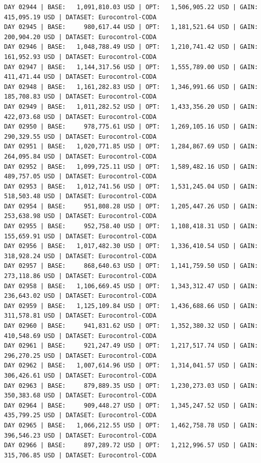 \documentclass[11pt,a4paper]{article}
\begin{document}
\begin{verbatim}
DAY 02944 | BASE:   1,091,810.03 USD | OPT:   1,506,905.22 USD | GAIN: 415,095.19 USD | DATASET: Eurocontrol-CODA
DAY 02945 | BASE:     980,617.44 USD | OPT:   1,181,521.64 USD | GAIN: 200,904.20 USD | DATASET: Eurocontrol-CODA
DAY 02946 | BASE:   1,048,788.49 USD | OPT:   1,210,741.42 USD | GAIN: 161,952.93 USD | DATASET: Eurocontrol-CODA
DAY 02947 | BASE:   1,144,317.56 USD | OPT:   1,555,789.00 USD | GAIN: 411,471.44 USD | DATASET: Eurocontrol-CODA
DAY 02948 | BASE:   1,161,282.83 USD | OPT:   1,346,991.66 USD | GAIN: 185,708.83 USD | DATASET: Eurocontrol-CODA
DAY 02949 | BASE:   1,011,282.52 USD | OPT:   1,433,356.20 USD | GAIN: 422,073.68 USD | DATASET: Eurocontrol-CODA
DAY 02950 | BASE:     978,775.61 USD | OPT:   1,269,105.16 USD | GAIN: 290,329.55 USD | DATASET: Eurocontrol-CODA
DAY 02951 | BASE:   1,020,771.85 USD | OPT:   1,284,867.69 USD | GAIN: 264,095.84 USD | DATASET: Eurocontrol-CODA
DAY 02952 | BASE:   1,099,725.11 USD | OPT:   1,589,482.16 USD | GAIN: 489,757.05 USD | DATASET: Eurocontrol-CODA
DAY 02953 | BASE:   1,012,741.56 USD | OPT:   1,531,245.04 USD | GAIN: 518,503.48 USD | DATASET: Eurocontrol-CODA
DAY 02954 | BASE:     951,808.28 USD | OPT:   1,205,447.26 USD | GAIN: 253,638.98 USD | DATASET: Eurocontrol-CODA
DAY 02955 | BASE:     952,758.40 USD | OPT:   1,108,418.31 USD | GAIN: 155,659.91 USD | DATASET: Eurocontrol-CODA
DAY 02956 | BASE:   1,017,482.30 USD | OPT:   1,336,410.54 USD | GAIN: 318,928.24 USD | DATASET: Eurocontrol-CODA
DAY 02957 | BASE:     868,640.63 USD | OPT:   1,141,759.50 USD | GAIN: 273,118.86 USD | DATASET: Eurocontrol-CODA
DAY 02958 | BASE:   1,106,669.45 USD | OPT:   1,343,312.47 USD | GAIN: 236,643.02 USD | DATASET: Eurocontrol-CODA
DAY 02959 | BASE:   1,125,109.84 USD | OPT:   1,436,688.66 USD | GAIN: 311,578.81 USD | DATASET: Eurocontrol-CODA
DAY 02960 | BASE:     941,831.62 USD | OPT:   1,352,380.32 USD | GAIN: 410,548.69 USD | DATASET: Eurocontrol-CODA
DAY 02961 | BASE:     921,247.49 USD | OPT:   1,217,517.74 USD | GAIN: 296,270.25 USD | DATASET: Eurocontrol-CODA
DAY 02962 | BASE:   1,007,614.96 USD | OPT:   1,314,041.57 USD | GAIN: 306,426.61 USD | DATASET: Eurocontrol-CODA
DAY 02963 | BASE:     879,889.35 USD | OPT:   1,230,273.03 USD | GAIN: 350,383.68 USD | DATASET: Eurocontrol-CODA
DAY 02964 | BASE:     909,448.27 USD | OPT:   1,345,247.52 USD | GAIN: 435,799.25 USD | DATASET: Eurocontrol-CODA
DAY 02965 | BASE:   1,066,212.55 USD | OPT:   1,462,758.78 USD | GAIN: 396,546.23 USD | DATASET: Eurocontrol-CODA
DAY 02966 | BASE:     897,289.72 USD | OPT:   1,212,996.57 USD | GAIN: 315,706.85 USD | DATASET: Eurocontrol-CODA

\end{verbatim}
\end{document}
